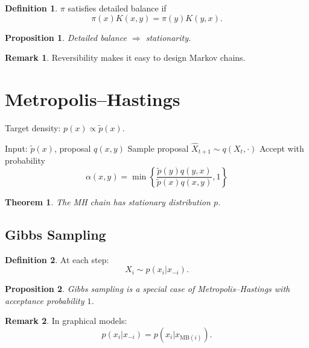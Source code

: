 \documentclass[12pt,oneside]{book}
\numberwithin{equation}{section}
\theoremstyle{definition}
\newtheorem{definition}{Definition}[section]
\newtheorem{remark}{Remark}[section]
\theoremstyle{plain}
\newtheorem{theorem}{Theorem}[section]
\newtheorem{proposition}{Proposition}[section]
\theoremstyle{remark}
\begin{document}
\begin{definition}
$\pi$ satisfies detailed balance if
\[
\pi(x)K(x,y) = \pi(y)K(y,x).
\]
\end{definition}

\begin{proposition}
Detailed balance $\Rightarrow$ stationarity.
\end{proposition}

\begin{remark}
Reversibility makes it easy to design Markov chains.
\end{remark}


\section{Metropolis--Hastings}

Target density: $p(x) \propto \tilde{p}(x)$.

\begin{algorithm}
\caption{Metropolis--Hastings}
\begin{algorithmic}
\State Input: $\tilde{p}(x)$, proposal $q(x,y)$
\State Sample proposal $\widehat{X}_{t+1} \sim q(X_t,\cdot)$
\State Accept with probability
\[
\alpha(x,y)
=
\min\left\{
\frac{\tilde{p}(y)q(y,x)}{\tilde{p}(x)q(x,y)}, 1
\right\}
\]
\EndFor
\end{algorithmic}
\end{algorithm}

\begin{theorem}
The MH chain has stationary distribution $p$.
\end{theorem}


\subsection*{Gibbs Sampling}

\begin{definition}
At each step:
\[
X_i \sim p(x_i | x_{-i}).
\]
\end{definition}

\begin{proposition}
Gibbs sampling is a special case of Metropolis--Hastings with acceptance probability $1$.
\end{proposition}

\begin{remark}
In graphical models:
\[
p(x_i | x_{-i}) = p(x_i | x_{\mathrm{MB}(i)}).
\]
\end{remark}
\end{document}
